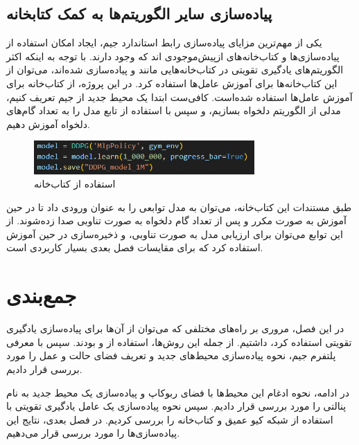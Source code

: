 \subsection{پیاده‌سازی سایر الگوریتم‌ها به کمک کتابخانه}
یکی از مهم‌ترین مزایای پیاده‌سازی رابط استاندارد جیم، ایجاد امکان استفاده از پیاده‌سازی‌ها و کتاب‌خانه‌های از‌پیش‌موجودی اند که وجود دارند.
با توجه به اینکه اکثر الگوریتم‌های یادگیری تقویتی در کتاب‌خانه‌هایی مانند  و  پیاده‌سازی شده‌اند،
می‌توان از این کتاب‌خانه‌ها برای آموزش عامل‌ها استفاده کرد.
در این پروژه، از کتاب‌خانه  برای آموزش عامل‌ها استفاده شده‌است.
کافی‌ست ابتدا یک محیط جدید از جیم تعریف کنیم، مدلی از الگوریتم دلخواه بسازیم، و سپس با استفاده از تابع 
مدل را به تعداد گام‌های دلخواه آموزش دهیم.
\begin{figure}[H]
    \centering
    \includegraphics[width=0.75\textwidth]{images/sb3.png}
    \caption{استفاده از کتاب‌خانه }\label{fig:sb3}
\end{figure}
طبق مستندات این کتاب‌خانه، می‌توان به مدل توابعی را به عنوان ورودی داد تا در حین آموزش به صورت مکرر و پس از تعداد گام دلخواه به صورت تناوبی صدا زده‌شوند.
 از این توابع می‌توان برای ارزیابی مدل به صورت تناوبی، و ذخیره‌سازی در حین آموزش استفاده کرد که برای مقایسات فصل بعدی بسیار کاربردی است.
\section{جمع‌بندی}
در این فصل، مروری بر راه‌های مختلفی که می‌توان از آن‌ها برای پیاده‌سازی یادگیری تقویتی استفاده کرد، داشتیم.
از جمله این روش‌ها، استفاده از  و  بودند.
سپس با معرفی پلتفرم جیم، نحوه پیاده‌سازی محیط‌های جدید و تعریف فضای حالت و عمل را مورد بررسی قرار دادیم.

در ادامه، نحوه ادغام این محیط‌ها با فضای ربوکاپ و پیاده‌سازی یک محیط جدید به نام پنالتی را مورد بررسی قرار دادیم.
سپس نحوه پیاده‌سازی یک عامل یادگیری تقویتی با استفاده از شبکه کیو عمیق و کتاب‌خانه  را بررسی کردیم.
در فصل بعدی، نتایج این پیاده‌سازی‌ها را مورد بررسی قرار می‌دهیم.
